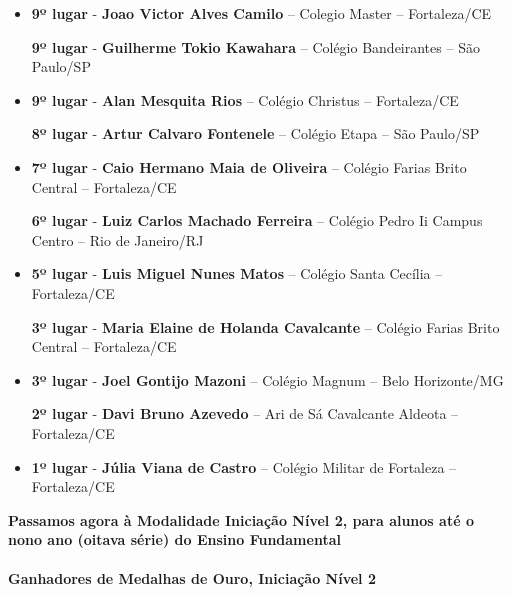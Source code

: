 \documentclass{article}
\begin{document}
\begin{itemize}
\item
\textbf{9º lugar} - \textbf{Joao Victor Alves Camilo} – Colegio Master – Fortaleza/CE


\textbf{9º lugar} - \textbf{Guilherme Tokio Kawahara} – Colégio Bandeirantes – São Paulo/SP



\item
\textbf{9º lugar} - \textbf{Alan Mesquita Rios} – Colégio Christus – Fortaleza/CE


\textbf{8º lugar} - \textbf{Artur Calvaro Fontenele} – Colégio Etapa – São Paulo/SP



\item
\textbf{7º lugar} - \textbf{Caio Hermano Maia de Oliveira} – Colégio Farias Brito Central – Fortaleza/CE


\textbf{6º lugar} - \textbf{Luiz Carlos Machado Ferreira} – Colégio Pedro Ii Campus Centro – Rio de Janeiro/RJ



\item
\textbf{5º lugar} - \textbf{Luis Miguel Nunes Matos} – Colégio Santa Cecília – Fortaleza/CE


\textbf{3º lugar} - \textbf{Maria Elaine de Holanda Cavalcante} – Colégio Farias Brito Central – Fortaleza/CE



\item
\textbf{3º lugar} - \textbf{Joel Gontijo Mazoni} – Colégio Magnum – Belo Horizonte/MG


\textbf{2º lugar} - \textbf{Davi Bruno Azevedo} – Ari de Sá Cavalcante Aldeota – Fortaleza/CE



\item
\textbf{1º lugar} - \textbf{Júlia Viana de Castro} – Colégio Militar de Fortaleza – Fortaleza/CE



\end{itemize}

\color{blue}
\textbf{Passamos agora à Modalidade Iniciação Nível 2, para alunos até o nono ano (oitava série) do Ensino Fundamental}\\\\
\textbf{\color{blue}Ganhadores de Medalhas de Ouro, \color{black}Iniciação Nível 2}
\color{black}
\end{document}
